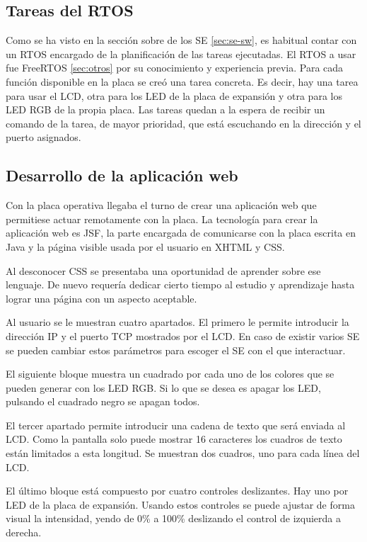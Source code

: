 \subsection{Tareas del RTOS}{\label{sec:desarrollo-rtos}}
Como se ha visto en la sección sobre  de los SE 
\ref{sec:se-sw}, es habitual contar con un RTOS encargado de la planificación
de las tareas ejecutadas. El RTOS a usar fue FreeRTOS \ref{sec:otros} por su
conocimiento y experiencia previa. Para cada función disponible en la placa se
creó una tarea concreta. Es decir, hay una tarea para usar el LCD, otra para los
LED de la placa de expansión y otra para los LED RGB de la propia placa. 
Las tareas quedan a la espera de recibir un comando de la tarea, de mayor
prioridad, que está escuchando en la dirección y el puerto asignados.

\subsection{Desarrollo de la aplicación web}{\label{sec:desarrollo-app}}
Con la placa operativa llegaba el turno de crear una aplicación web que
permitiese actuar remotamente con la placa. La tecnología para crear la
aplicación web es JSF, la parte encargada de comunicarse con la placa escrita
en Java y la página visible usada por el usuario en XHTML y CSS.

Al desconocer CSS se presentaba una oportunidad de aprender sobre ese lenguaje.
De nuevo requería dedicar cierto tiempo al estudio y aprendizaje hasta lograr
una página con un aspecto aceptable.

Al usuario se le muestran cuatro apartados. El primero le permite introducir la
dirección IP y el puerto TCP mostrados por el LCD. En caso de existir varios SE
se pueden cambiar estos parámetros para escoger el SE con el que interactuar.

El siguiente bloque muestra un cuadrado por cada uno de los colores que se
pueden generar con los LED RGB. Si lo que se desea es apagar los LED, pulsando
el cuadrado negro se apagan todos.

El tercer apartado permite introducir una cadena de texto que será enviada al
LCD. Como la pantalla solo puede mostrar 16 caracteres los cuadros de texto
están limitados a esta longitud. Se muestran dos cuadros, uno para cada línea
del LCD.

El último bloque está compuesto por cuatro controles deslizantes. Hay uno por
LED de la placa de expansión. Usando estos controles se puede ajustar de forma
visual la intensidad, yendo de 0\% a 100\% deslizando el control de izquierda
a derecha.

